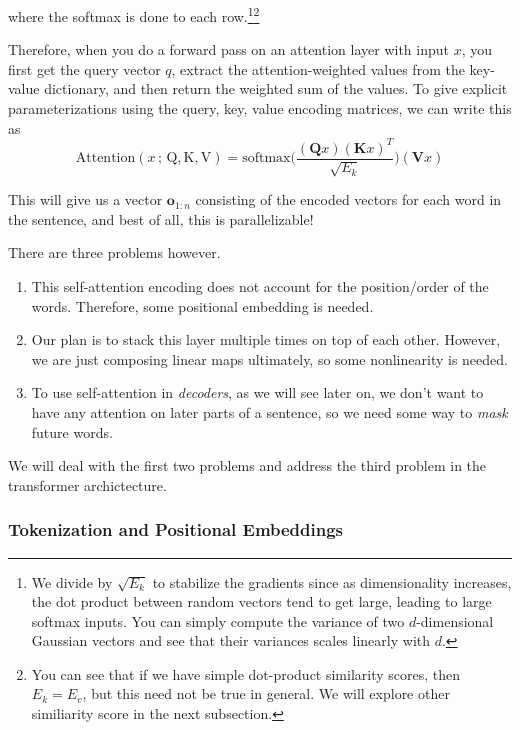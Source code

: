 \documentclass{article}
\begin{document}
\begin{definition}
      where the softmax is done to each row.\footnote{We divide by $\sqrt{E_k}$ to stabilize the gradients since as dimensionality increases, the dot product between random vectors tend to get large, leading to large softmax inputs. You can simply compute the variance of two $d$-dimensional Gaussian vectors and see that their variances scales linearly with $d$. }\footnote{You can see that if we have simple dot-product similarity scores, then $E_k = E_v$, but this need not be true in general. We will explore other similiarity score in the next subsection. } 

      Therefore, when you do a forward pass on an attention layer with input $x$, you first get the query vector $q$, extract the attention-weighted values from the key-value dictionary, and then return the weighted sum of the values. To give explicit parameterizations using the query, key, value encoding matrices, we can write this as 
      \begin{equation} 
        \mathrm{Attention}(x \,;\, \mathrm{Q}, \mathrm{K}, \mathrm{V}) = \mathrm{softmax} \bigg( \frac{(\mathbf{Q}x)(\mathbf{K} x)^T}{\sqrt{E_k}} \bigg) (\mathbf{V} x)
      \end{equation}

      This will give us a vector $\mathbf{o}_{1:n}$ consisting of the encoded vectors for each word in the sentence, and best of all, this is parallelizable! 
    \end{definition}

    There are three problems however. 
    \begin{enumerate}
      \item This self-attention encoding does not account for the position/order of the words. Therefore, some positional embedding is needed. 
      \item Our plan is to stack this layer multiple times on top of each other. However, we are just composing linear maps ultimately, so some nonlinearity is needed. 
      \item To use self-attention in \textit{decoders}, as we will see later on, we don't want to have any attention on later parts of a sentence, so we need some way to \textit{mask} future words. 
    \end{enumerate}

    We will deal with the first two problems and address the third problem in the transformer archictecture. 

  \subsubsection{Tokenization and Positional Embeddings}
\end{document}
